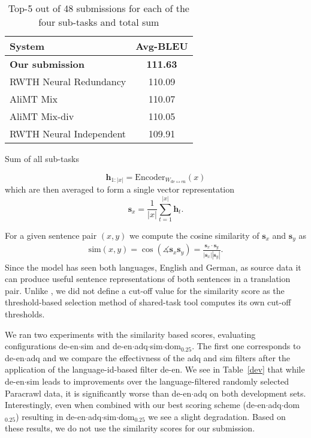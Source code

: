 \documentclass[11pt,a4paper]{article}
\begin{document}
\begin{table*}[t]
\begin{subtable}[t]{9cm}\centering
\begin{tabular}{p{5cm}c} \toprule
System & Avg-BLEU \\ \midrule
\bf  Our submission  & \bf 111.63 \\
RWTH Neural Redundancy & 110.09 \\
AliMT Mix & 110.07  \\
AliMT Mix-div & 110.05 \\
RWTH Neural Independent & 109.91 \\
\bottomrule
\end{tabular}
\caption{Sum of all sub-tasks}
\end{subtable}

\caption{Top-5 out of 48 submissions for each of the four sub-tasks and total sum}\label{results}
\end{table*}

 
\begin{equation}
\mathbf{h}_{1:|x|} = \mathrm{Encoder}_{W_{\mathrm{de}\leftrightarrow\mathrm{en}}}(x)
\end{equation}
which are then averaged to form a single vector representation
\begin{equation}
\mathbf{s}_x = \frac{1}{|x|}\sum_{t=1}^{|x|} \mathbf{h}_t .
\end{equation}

For a given sentence pair $(x,y)$ we compute the cosine similarity of $\mathbf{s}_x$ and $\mathbf{s}_y$ as
\begin{equation}
\begin{aligned}
\mathrm{sim}(x,y) = \cos(\measuredangle\mathbf{s}_x \mathbf{s}_y) = \frac{\mathbf{s}_x \cdot \mathbf{s}_y}{|\mathbf{s}_x| |\mathbf{s}_y|}.
\end{aligned}
\end{equation}
Since the model has seen both languages, English and German, as source data it can produce useful sentence representations of both sentences in a translation pair. Unlike , we did not define a cut-off value for the similarity score as the threshold-based selection method of shared-task tool computes its own cut-off thresholds. %


We ran two experiments with the similarity based scores, evaluating configurations de-en$\cdot$sim and de-en$\cdot$adq$\cdot$sim$\cdot$dom$_{0.25}$. The first one corresponds to de-en$\cdot$adq and we compare the effectivness of the adq and sim filters after the application of the language-id-based filter de-en. We see in Table~\ref{dev} that while de-en$\cdot$sim leads to improvements over the language-filtered randomly selected Paracrawl data, it is significantly worse than de-en$\cdot$adq on both development sets. Interestingly, even when combined with our best scoring scheme (de-en$\cdot$adq$\cdot$dom$_{0.25}$) resulting in de-en$\cdot$adq$\cdot$sim$\cdot$dom$_{0.25}$ we see a slight degradation. Based on these results, we do not use the similarity scores for our submission.
\end{document}

